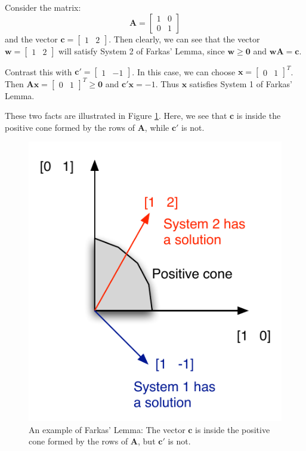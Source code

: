 \begin{example} Consider the matrix:
\begin{displaymath}
\mathbf{A} = \begin{bmatrix}
1 & 0\\
0 & 1
\end{bmatrix}
\end{displaymath}
and the vector $\mathbf{c} = \begin{bmatrix}1 & 2\end{bmatrix}$. Then clearly, we can see that the vector $\mathbf{w} = \begin{bmatrix}1 & 2\end{bmatrix}$ will satisfy System 2 of Farkas' Lemma, since $\mathbf{w} \geq \mathbf{0}$ and $\mathbf{w}\mathbf{A} = \mathbf{c}$. 

Contrast this with $\mathbf{c}' = \begin{bmatrix}1 & -1\end{bmatrix}$. In this case, we can choose $\mathbf{x} = \begin{bmatrix}0 & 1\end{bmatrix}^T$. Then $\mathbf{A}\mathbf{x} = \begin{bmatrix}0 & 1\end{bmatrix}^T \geq \mathbf{0}$ and $\mathbf{c}'\mathbf{x} = -1$. Thus $\mathbf{x}$ satisfies System 1 of Farkas' Lemma.

These two facts are illustrated in Figure \ref{fig:FarkasExample}. Here, we see that $\mathbf{c}$ is inside the positive cone formed by the rows of $\mathbf{A}$, while $\mathbf{c}'$ is not. 
\begin{figure}[ht]
\centering
\includegraphics[scale=0.5]{ExampleFarkas.pdf}
\caption{An example of Farkas' Lemma: The vector $\mathbf{c}$ is inside the positive cone formed by the rows of $\mathbf{A}$, but $\mathbf{c}'$ is not.}
\label{fig:FarkasExample} 
\end{figure}
\end{example}

